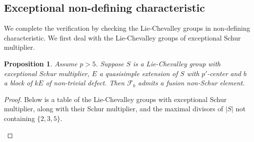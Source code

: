 \documentclass{amsart}
\theoremstyle{plain}\newtheorem{theorem}{Theorem}[section]
\theoremstyle{plain}\newtheorem{conjecture}[theorem]{Conjecture}
\theoremstyle{plain}\newtheorem{corollary}[theorem]{Corollary}
\theoremstyle{plain}\newtheorem{lemma}[theorem]{Lemma}
\theoremstyle{plain}\newtheorem{proposition}[theorem]{Proposition}
\theoremstyle{plain}\newtheorem{statement}[theorem]{}
\theoremstyle{definition}\newtheorem{definition}[theorem]{Definition}
\theoremstyle{definition}\newtheorem{example}[theorem]{Example}
\theoremstyle{definition}\newtheorem{examples}[theorem]{Examples}
\theoremstyle{definition}\newtheorem{notation}[theorem]{Notation}
\theoremstyle{definition}\newtheorem{remark}[theorem]{Remark}
\theoremstyle{definition}\newtheorem{remarks}[theorem]{Remarks}
\theoremstyle{definition}\newtheorem{question}[theorem]{Question}
\theoremstyle{definition}\newtheorem{propositiondefinition}[theorem]{Definition/Proposition}
\begin{document}
\subsection{Exceptional non-defining characteristic}
We complete the verification by checking the Lie-Chevalley groups in non-defining characteristic. We first deal with the Lie-Chevalley groups of exceptional Schur multiplier. 
\begin{proposition} Assume $p>5$. Suppose $S$ is a Lie-Chevalley group with exceptional Schur multiplier, $E$ a quasisimple extension of $S$ with $p'$-center and $b$ a block of $kE$ of non-trivial defect. Then $\mathcal{F}_b$ admits a fusion non-Schur element.
\end{proposition}
\begin{proof}
	Below is a table of the Lie-Chevalley groups with exceptional Schur multiplier, along with their Schur multiplier, and the maximal divisors of $|S|$ not containing $\{2,3,5\}$.
\begin{center}
\end{center}
\end{proof}
\end{document}
